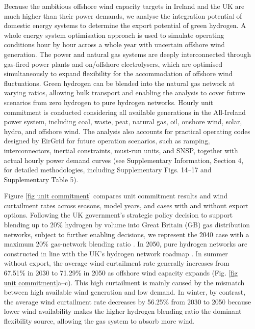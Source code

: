 \documentclass[pdflatex,sn-mathphys,Numbered]{sn-jnl}%
\begin{document}
Because the ambitious offshore wind capacity targets in Ireland and the UK are much higher than their power demands, we analyse the integration potential of domestic energy systems to determine the export potential of green hydrogen. A whole energy system optimisation approach is used to simulate operating conditions hour by hour across a whole year with uncertain offshore wind generation. The power and natural gas systems are deeply interconnected through gas-fired power plants and on/offshore electrolysers, which are optimised simultaneously to expand flexibility for the accommodation of offshore wind fluctuations. Green hydrogen can be blended into the natural gas network at varying ratios, allowing bulk transport and enabling the analysis to cover future scenarios from zero hydrogen to pure hydrogen networks.
Hourly unit commitment is conducted considering all available generations in the All-Ireland power system, including coal, waste, peat, natural gas, oil, onshore wind, solar, hydro, and offshore wind. The analysis also accounts for practical operating codes designed by EirGrid \cite{OperationalPolicy} for future operation scenarios, such as ramping, interconnectors, inertial constraints, must-run units, and SNSP, together with actual hourly power demand curves (see Supplementary Information, Section 4, for detailed methodologies, including Supplementary Figs. 14--17 and Supplementary Table 5).

Figure \ref{fig unit commitment} compares unit commitment results and wind curtailment rates across seasons, model years, and cases with and without export options. Following the UK government's strategic policy decision to support blending up to 20\% hydrogen by volume into Great Britain (GB) gas distribution networks, subject to further enabling decisions, we represent the 2040 case with a maximum 20\% gas-network blending ratio \cite{HydrogenblendinginGB}. In 2050, pure hydrogen networks are constructed in line with the UK's hydrogen network roadmap \cite{BritainsHydrogenNetworkPlan}. In summer without export, the average wind curtailment rate generally increases from 67.51\% in 2030 to 71.29\% in 2050 as offshore wind capacity expands (Fig. \ref{fig unit commitment}a--c). This high curtailment is mainly caused by the mismatch between high available wind generation and low demand. In winter, by contrast, the average wind curtailment rate decreases by 56.25\% from 2030 to 2050 because lower wind availability makes the higher hydrogen blending ratio the dominant flexibility source, allowing the gas system to absorb more wind.
\end{document}
